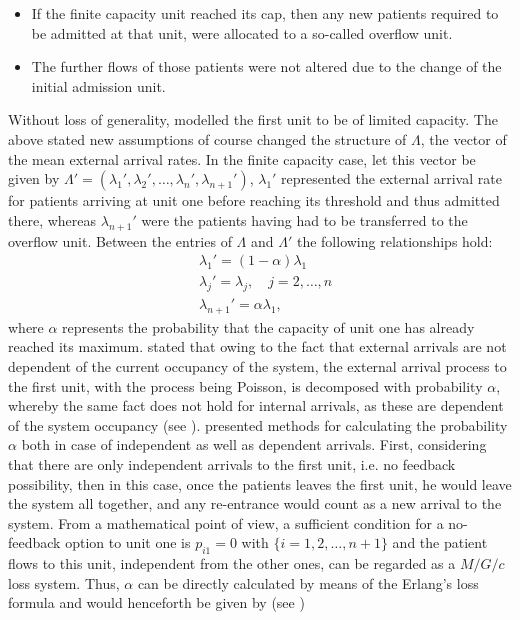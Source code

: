 \documentclass[11pt,a4paper]{article}
\begin{document}
\begin{spacing}{1.8}
\begin{itemize}
\item If the finite capacity unit reached its cap, then any new patients required to be admitted at that unit, were allocated to a so-called overflow unit.
\item The further flows of those patients were not altered due to the change of the initial admission unit.
\end{itemize}
Without loss of generality, \citet{Hershey1981} modelled the first unit to be of limited capacity.
The above stated new assumptions of course changed the structure of \(\Lambda\), the vector of the mean external arrival rates. In the finite capacity case, let this vector be given by \(\Lambda ' = \left( \lambda_1 ', \lambda_2 ', \dots, \lambda_n ', \lambda_{n+1} ' \right)\),  \(\lambda_1 '\) represented the external arrival rate for patients arriving at unit one before reaching its threshold and thus admitted there, whereas \(\lambda_{n+1} '\) were the patients having had to be transferred to the overflow unit. Between the entries of \(\Lambda\) and \(\Lambda '\) the following relationships hold:
\begin{align*}
& \lambda_1 ' = (1-\alpha) \lambda_1 \\
& \lambda_j ' = \lambda_j, \quad j = 2, \dots, n \\
& \lambda_{n+1} ' = \alpha \lambda_{1},
\end{align*}
where \(\alpha\) represents the probability that the capacity of unit one has already reached its maximum. 
\citet{Hershey1981} stated that owing to the fact that external arrivals are not dependent of the current occupancy of the system, the external arrival process to the first unit, with the process being Poisson, is decomposed with probability \(\alpha\), whereby the same fact does not hold for internal arrivals, as these are dependent of the system occupancy (see \citep{Melamed1977}). \citet{Hershey1981} presented methods for calculating the probability \(\alpha\) both in case of independent as well as dependent arrivals. \medskip First, considering that there are only independent arrivals to the first unit, i.e. no feedback possibility, then in this case, once the patients leaves the first unit, he would leave the system all together, and any re-entrance would count as a new arrival to the system. From a mathematical point of view, 
a sufficient condition for a no-feedback option to unit one is \(p_{i1} = 0\) with \(\{i = 1,2, \dots, n+1\} \) and the patient flows to this unit, independent from the other ones,  can be regarded as a \( M/G/c \) loss system. Thus, \( \alpha\) can be directly calculated by means of the Erlang's loss formula and would henceforth be given by (see \citep{Gross2008})

\end{spacing}
\end{document}
